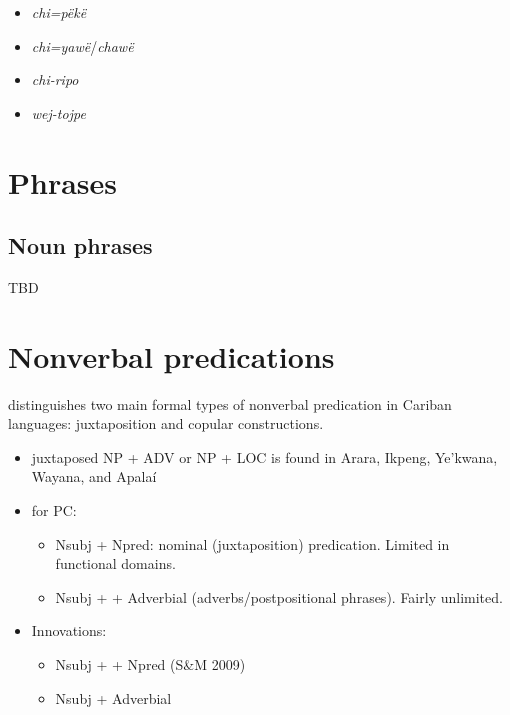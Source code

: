 \documentclass{memoir}
\begin{document}
\begin{itemize}
\tightlist
\item
  \emph{chi=pëkë}
\item
  \emph{chi=yawë}/\emph{chawë}
\item
  \emph{chi-ripo}
\item
  \emph{wej-tojpe}
\end{itemize}

\chapter{\texorpdfstring{Phrases \label{phrases}}{Phrases }}

\section{\texorpdfstring{Noun phrases
\label{sec:nounphrases}}{Noun phrases }}

TBD

\chapter{\texorpdfstring{Nonverbal predications
\label{nonverbal}}{Nonverbal predications }}

\textcites[366]{gildea2018reconstructing} distinguishes two main formal
types of nonverbal predication in Cariban languages: juxtaposition and
copular constructions.

\begin{itemize}
\tightlist
\item
  juxtaposed NP + ADV or NP + LOC is found in Arara, Ikpeng, Ye'kwana,
  Wayana, and Apalaí
\item
  for PC:

  \begin{itemize}
  \tightlist
  \item
    Nsubj + Npred: nominal (juxtaposition) predication. Limited in
    functional domains.
  \item
    Nsubj +  + Adverbial (adverbs/postpositional phrases).
    Fairly unlimited.
  \end{itemize}
\item
  Innovations:

  \begin{itemize}
  \tightlist
  \item
    Nsubj +  + Npred (S\&M 2009)
  \item
    Nsubj + Adverbial
  \end{itemize}
\end{itemize}
\end{document}

